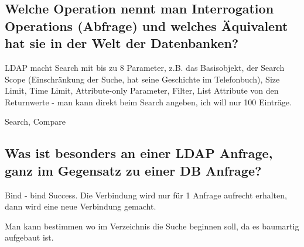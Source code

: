 \subsection{Welche Operation nennt man Interrogation Operations (Abfrage) und welches Äquivalent hat sie in der Welt der Datenbanken?}

LDAP macht Search mit bis zu 8 Parameter, z.B. das Basisobjekt, der Search Scope (Einschränkung der Suche, hat seine Geschichte im Telefonbuch), Size Limit, Time Limit, Attribute-only Parameter, Filter, List Attribute von den Returnwerte - man kann direkt beim Search angeben, ich will nur 100 Einträge.


Search, Compare



\subsection{Was ist besonders an einer LDAP Anfrage, ganz im Gegensatz zu einer DB Anfrage?}

Bind - bind Success. Die Verbindung wird nur für 1 Anfrage aufrecht erhalten, dann wird eine neue Verbindung gemacht.

Man kann bestimmen wo im Verzeichnis die Suche beginnen soll, da es baumartig aufgebaut ist.